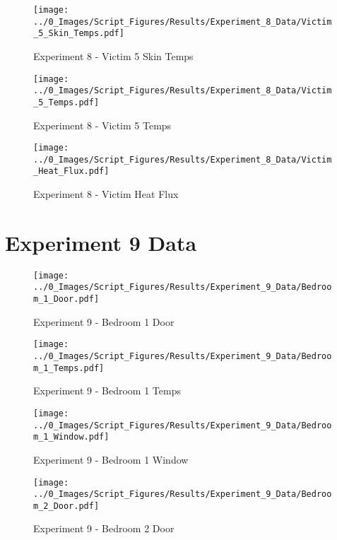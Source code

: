 	\clearpage

	\begin{figure}[H]
		\centering
		\texttt{[image: ../0\_Images/Script\_Figures/Results/Experiment\_8\_Data/Victim\_5\_Skin\_Temps.pdf]}
		\caption[]{Experiment 8 - Victim 5 Skin Temps}
	\end{figure}
 

	\begin{figure}[H]
		\centering
		\texttt{[image: ../0\_Images/Script\_Figures/Results/Experiment\_8\_Data/Victim\_5\_Temps.pdf]}
		\caption[]{Experiment 8 - Victim 5 Temps}
	\end{figure}
 
	\clearpage

	\begin{figure}[H]
		\centering
		\texttt{[image: ../0\_Images/Script\_Figures/Results/Experiment\_8\_Data/Victim\_Heat\_Flux.pdf]}
		\caption[]{Experiment 8 - Victim Heat Flux}
	\end{figure}
 

\clearpage		\large
\section{Experiment 9 Data} \label{App:Exp9Results} 

	\begin{figure}[H]
		\centering
		\texttt{[image: ../0\_Images/Script\_Figures/Results/Experiment\_9\_Data/Bedroom\_1\_Door.pdf]}
		\caption[]{Experiment 9 - Bedroom 1 Door}
	\end{figure}
 

	\begin{figure}[H]
		\centering
		\texttt{[image: ../0\_Images/Script\_Figures/Results/Experiment\_9\_Data/Bedroom\_1\_Temps.pdf]}
		\caption[]{Experiment 9 - Bedroom 1 Temps}
	\end{figure}
 
	\clearpage

	\begin{figure}[H]
		\centering
		\texttt{[image: ../0\_Images/Script\_Figures/Results/Experiment\_9\_Data/Bedroom\_1\_Window.pdf]}
		\caption[]{Experiment 9 - Bedroom 1 Window}
	\end{figure}
 

	\begin{figure}[H]
		\centering
		\texttt{[image: ../0\_Images/Script\_Figures/Results/Experiment\_9\_Data/Bedroom\_2\_Door.pdf]}
		\caption[]{Experiment 9 - Bedroom 2 Door}
	\end{figure}
 
